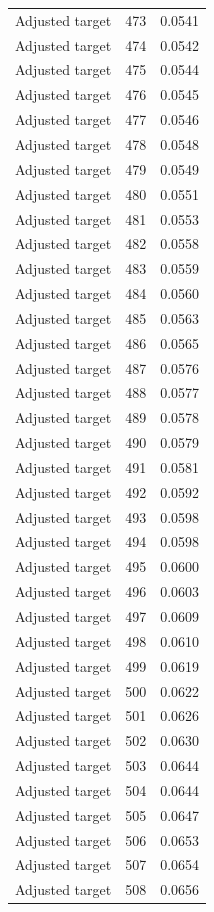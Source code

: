 \begin{table}[htbp]
\begin{tabular}{lll}
Adjusted target & 473 & 0.0541 \\
Adjusted target & 474 & 0.0542 \\
Adjusted target & 475 & 0.0544 \\
Adjusted target & 476 & 0.0545 \\
Adjusted target & 477 & 0.0546 \\
Adjusted target & 478 & 0.0548 \\
Adjusted target & 479 & 0.0549 \\
Adjusted target & 480 & 0.0551 \\
Adjusted target & 481 & 0.0553 \\
Adjusted target & 482 & 0.0558 \\
Adjusted target & 483 & 0.0559 \\
Adjusted target & 484 & 0.0560 \\
Adjusted target & 485 & 0.0563 \\
Adjusted target & 486 & 0.0565 \\
Adjusted target & 487 & 0.0576 \\
Adjusted target & 488 & 0.0577 \\
Adjusted target & 489 & 0.0578 \\
Adjusted target & 490 & 0.0579 \\
Adjusted target & 491 & 0.0581 \\
Adjusted target & 492 & 0.0592 \\
Adjusted target & 493 & 0.0598 \\
Adjusted target & 494 & 0.0598 \\
Adjusted target & 495 & 0.0600 \\
Adjusted target & 496 & 0.0603 \\
Adjusted target & 497 & 0.0609 \\
Adjusted target & 498 & 0.0610 \\
Adjusted target & 499 & 0.0619 \\
Adjusted target & 500 & 0.0622 \\
Adjusted target & 501 & 0.0626 \\
Adjusted target & 502 & 0.0630 \\
Adjusted target & 503 & 0.0644 \\
Adjusted target & 504 & 0.0644 \\
Adjusted target & 505 & 0.0647 \\
Adjusted target & 506 & 0.0653 \\
Adjusted target & 507 & 0.0654 \\
Adjusted target & 508 & 0.0656 \\

\end{tabular}
\end{table}
